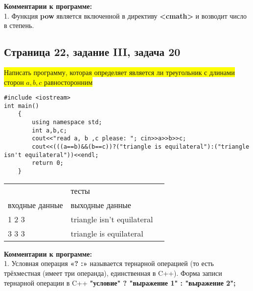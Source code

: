 \documentclass[11pt]{article}
\begin{document}
\begin{flushleft}
\textbf{Комментарии к программе:} \\
1. Функция \textbf{pow} является включенной в директиву \textbf{<cmath>} и возводит число в степень.

\newpage
\begin{center}
\section{Страница 22, задание III, задача 20}
\colorbox{yellow}{Написать программу, которая определяет является ли треугольник с длинами сторон $a,b,c$ равносторонним}
\end{center}
\begin{lstlisting}
#include <iostream>
int main()
	{
		using namespace std;
		int a,b,c;
		cout<<"read a, b ,c please: "; cin>>a>>b>>c;
		cout<<(((a==b)&&(b==c))?("triangle is equilateral"):("triangle isn't equilateral"))<<endl;
		return 0;
	}
\end{lstlisting}

\begin{table}[h]\begin{center}\begin{tabular}{|l|l|l}
\cline{1-2}
\multicolumn{2}{|c|}{тесты} &  \\ \cline{1-2}
     входные данные      &       выходные данные    &  \\ \cline{1-2}
         1 2 3  &       triangle isn't equilateral
    &  \\ \cline{1-2}
    3 3 3  &       triangle is equilateral
    &  \\ \cline{1-2}
\end{tabular}\end{center}\end{table}

\textbf{Комментарии к программе:} \\
1. Условная операция \textbf{«? :»} называется тернарной операцией (то есть трёхместная (имеет три операнда), единственная в C++). Форма записи тернарной операции в C++ \textbf{"условие" ? "выражение 1" : "выражение 2";}

\newpage
\begin{center}

\end{center}
\end{flushleft}
\end{document}
